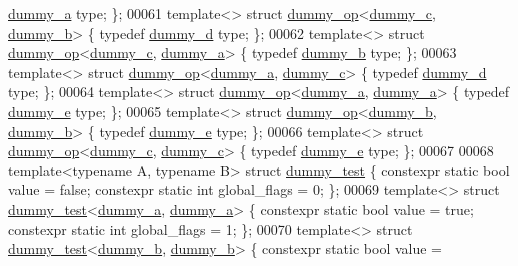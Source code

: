 \begin{DoxyCode}
      \hyperlink{structdummy__a}{dummy\_a} type; \};
00061 \textcolor{keyword}{template}<> \textcolor{keyword}{struct }\hyperlink{structdummy__op}{dummy\_op}<\hyperlink{structdummy__c}{dummy\_c}, \hyperlink{structdummy__b}{dummy\_b}> \{ \textcolor{keyword}{typedef} 
      \hyperlink{structdummy__d}{dummy\_d} type; \};
00062 \textcolor{keyword}{template}<> \textcolor{keyword}{struct }\hyperlink{structdummy__op}{dummy\_op}<\hyperlink{structdummy__c}{dummy\_c}, \hyperlink{structdummy__a}{dummy\_a}> \{ \textcolor{keyword}{typedef} 
      \hyperlink{structdummy__b}{dummy\_b} type; \};
00063 \textcolor{keyword}{template}<> \textcolor{keyword}{struct }\hyperlink{structdummy__op}{dummy\_op}<\hyperlink{structdummy__a}{dummy\_a}, \hyperlink{structdummy__c}{dummy\_c}> \{ \textcolor{keyword}{typedef} 
      \hyperlink{structdummy__d}{dummy\_d} type; \};
00064 \textcolor{keyword}{template}<> \textcolor{keyword}{struct }\hyperlink{structdummy__op}{dummy\_op}<\hyperlink{structdummy__a}{dummy\_a}, \hyperlink{structdummy__a}{dummy\_a}> \{ \textcolor{keyword}{typedef} 
      \hyperlink{structdummy__e}{dummy\_e} type; \};
00065 \textcolor{keyword}{template}<> \textcolor{keyword}{struct }\hyperlink{structdummy__op}{dummy\_op}<\hyperlink{structdummy__b}{dummy\_b}, \hyperlink{structdummy__b}{dummy\_b}> \{ \textcolor{keyword}{typedef} 
      \hyperlink{structdummy__e}{dummy\_e} type; \};
00066 \textcolor{keyword}{template}<> \textcolor{keyword}{struct }\hyperlink{structdummy__op}{dummy\_op}<\hyperlink{structdummy__c}{dummy\_c}, \hyperlink{structdummy__c}{dummy\_c}> \{ \textcolor{keyword}{typedef} 
      \hyperlink{structdummy__e}{dummy\_e} type; \};
00067 
00068 \textcolor{keyword}{template}<\textcolor{keyword}{typename} A, \textcolor{keyword}{typename} B> \textcolor{keyword}{struct }\hyperlink{structdummy__test}{dummy\_test} \{ constexpr \textcolor{keyword}{static} \textcolor{keywordtype}{bool} value = \textcolor{keyword}{false}; 
      constexpr \textcolor{keyword}{static} \textcolor{keywordtype}{int} global\_flags = 0; \};
00069 \textcolor{keyword}{template}<> \textcolor{keyword}{struct }\hyperlink{structdummy__test}{dummy\_test}<\hyperlink{structdummy__a}{dummy\_a}, \hyperlink{structdummy__a}{dummy\_a}>     \{ constexpr \textcolor{keyword}{static} \textcolor{keywordtype}{bool} value = \textcolor{keyword}{
      true};  constexpr \textcolor{keyword}{static} \textcolor{keywordtype}{int} global\_flags = 1; \};
00070 \textcolor{keyword}{template}<> \textcolor{keyword}{struct }\hyperlink{structdummy__test}{dummy\_test}<\hyperlink{structdummy__b}{dummy\_b}, \hyperlink{structdummy__b}{dummy\_b}>     \{ constexpr \textcolor{keyword}{static} \textcolor{keywordtype}{bool} value = \textcolor{keyword}{
}
\end{DoxyCode}
